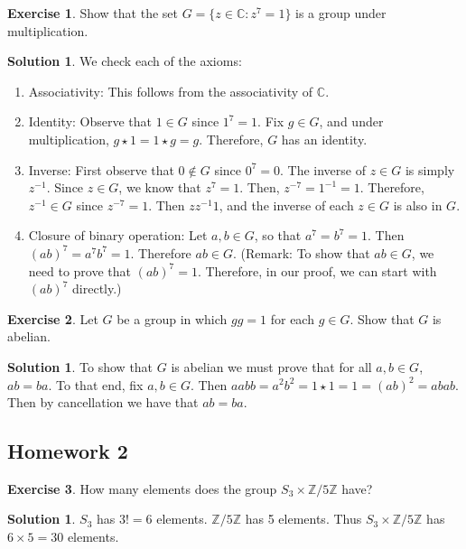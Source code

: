 \documentclass[12pt]{article}
\theoremstyle{definition}
\newtheorem{exercise}{Exercise}
\theoremstyle{definition}
\newtheorem{solution}[theorem]{Solution}
\newcommand{\Z}{\mathbb{Z}}
\begin{document}
\begin{exercise}
Show that the set $G = \{z \in \mathbb{C}: z^7 = 1\}$ is a group under multiplication.
\end{exercise}
\begin{solution}
We check each of the axioms:
\begin{enumerate}
\item Associativity: This follows from the associativity of $\mathbb{C}$.
\item Identity: Observe that $1 \in G$ since $1^7 = 1$. Fix $g \in G$, and under multiplication, $g \star 1 = 1 \star g = g$. Therefore, $G$ has an identity.
\item Inverse: First observe that $0 \not\in G$ since $0^7 = 0$. The inverse of $z \in G$ is simply $z^{-1}$. Since $z \in G$, we know that $z^7 = 1$. Then, $z^{-7} = 1^{-1} = 1$. Therefore, $z^{-1} \in G$ since $z^{-7} = 1$. Then $z z^{-1} 1$, and the inverse of each $z \in G$ is also in $G$.
\item Closure of binary operation: Let $a,b \in G$, so that $a^7 = b^7 = 1$. Then $(ab)^7 = a^7 b^7 = 1$. Therefore $ab \in G$. (Remark: To show that $ab \in G$, we need to prove that $(ab)^7 = 1$. Therefore, in our proof, we can start with $(ab)^7$ directly.)
\end{enumerate}
\end{solution}

\begin{exercise}
Let $G$ be a group in which $gg = 1$ for each $g \in G$. Show that $G$ is abelian.
\end{exercise}
\begin{solution}
To show that $G$ is abelian we must prove that for all $a,b \in G$, $ab = ba$. To that end, fix $a,b \in G$. Then $aabb = a^2 b^2 = 1 \star 1 = 1 = (ab)^2 = abab$. Then by cancellation we have that $ab = ba$.
\end{solution}


\subsection{Homework 2}
\begin{exercise}
How many elements does the group $S_3 \times \mathbb{Z}/5\mathbb{Z}$ have?
\end{exercise}
\begin{solution}
$S_3$ has $3! = 6$ elements. $\Z / 5 \Z$ has 5 elements. Thus $S_3 \times \mathbb{Z}/5\mathbb{Z}$ has $ 6 \times 5 = 30$ elements. 
\end{solution}
\end{document}
